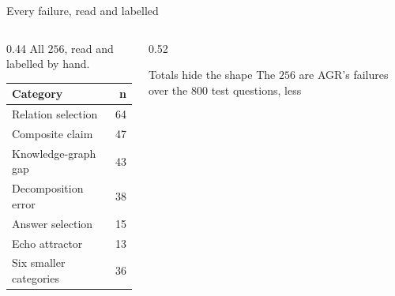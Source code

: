 \begin{frame}{Every failure, read and labelled}
  \bodyshift{-1pt}
  \begin{columns}[T]
    \begin{column}{0.44\textwidth}
      All $256$, read and labelled by hand.

      \vspace{2mm}
      \begin{tabular}{@{}lr@{}}
        \toprule
        \textbf{Category} & \textbf{n} \\
        \midrule
        Relation selection   & 64 \\
        Composite claim      & 47 \\
        Knowledge-graph gap  & 43 \\
        Decomposition error  & 38 \\
        Answer selection     & 15 \\
        \alert{Echo attractor} & \alert{13} \\
        \midrule
        Six smaller categories & 36 \\
        \bottomrule
      \end{tabular}
    \end{column}
    \begin{column}{0.52\textwidth}
      \begin{block}{Totals hide the shape}
        \small\agrraggedright
        The $256$ are AGR's failures over the $800$ test questions, less

\end{block}
\end{column}
\end{columns}
\end{frame}
